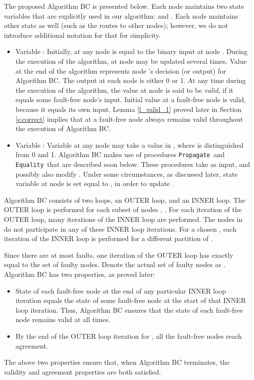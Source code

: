 \documentclass[letterpaper, 11pt]{article}
\newcommand{\Propagate}{{\tt Propagate}}
\newcommand{\Equality}{{\tt Equality}}
\begin{document}
The proposed Algorithm BC is presented below.
Each node  maintains two state variables that are
explicitly used in our algorithm:  and .
Each node maintains other state as well (such as
the routes to other nodes); however, we do not introduce
additional notation for that for simplicity.

\begin{itemize}

\item
{Variable :}
Initially,  at any node  is equal to the binary input at node .
During the execution of the algorithm,  at node  may be updated
several times. Value  at the end of the algorithm
represents node 's decision (or output)
for Algorithm BC. The output at each node is
either 0 or 1. At any time during the execution of the algorithm,
the value  at node  is said to be {\em valid}, if it equals some fault-free node's input. Initial value  at a fault-free node  is valid, because it equals its own input.
Lemma \ref{l_valid_1} proved later in Section \ref{s:correct} implies that  at a fault-free node  always remains valid
throughout the execution of Algorithm BC.

\item
{Variable :} Variable  at any node  
may take a value in , where  is distinguished
from 0 and 1.
Algorithm BC makes use of procedures \Propagate~and \Equality~that are described soon below. These procedures take  as input, and possibly also modify .
Under some circumstances, as discussed later, state variable  at node  is set equal to ,
in order to update .
\end{itemize}


Algorithm BC consists of two loops, an OUTER loop, and an INNER loop. The OUTER loop is performed for
each subset of nodes , . 
For each iteration of the OUTER loop, many iterations of the INNER loop are performed.
The nodes in  do not participate in any of these INNER loop iterations.
For a chosen ,
each iteration of the INNER loop is performed for a different partition of .

Since there are at most  faults, one iteration of the OUTER loop has  exactly equal
to the set of faulty nodes. Denote the actual set of faulty nodes as . 
Algorithm BC has two properties, as proved later:
\begin{itemize}
\item State  of each fault-free node  at the end of any particular INNER loop iteration equals the state of some
fault-free node at the start of that INNER loop iteration. 
Thus, Algorithm BC ensures that the state  of each fault-free node  remains valid at all times.
\item
By the end of the OUTER loop iteration for , all the fault-free nodes reach agreement.
\end{itemize}
The above two properties ensure that, when Algorithm BC terminates, the validity and agreement properties are both satisfied. 
\end{document}
